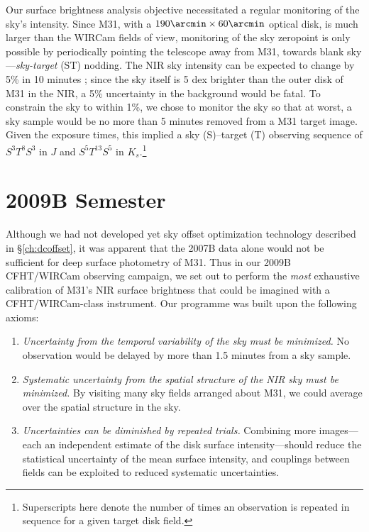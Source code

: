 \documentclass[iop]{emulateapj}
\begin{document}
Our surface brightness analysis objective necessitated a regular monitoring of the sky's intensity. Since M31, with a $190\arcmin \times 60\arcmin$ optical disk, is much larger than the WIRCam fields of view, monitoring of the sky zeropoint is only possible by periodically pointing the telescope away from M31, towards blank sky---\emph{sky-target} (ST) nodding. The NIR sky intensity can be expected to change by 5\% in 10 minutes \citep{Adams:1996,Vaduvescu:2004}; since the sky itself is 5 dex brighter than the outer disk of M31 in the NIR, a 5\% uncertainty in the background would be fatal. To constrain the sky to within 1\%, we chose to monitor the sky so that at worst, a sky sample would be no more than 5 minutes removed from a M31 target image. Given the exposure times, this implied a sky (S)--target (T) observing sequence of $S^3T^8S^3$ in $J$ and $S^5T^{13}S^5$ in $K_s$.\footnote{Superscripts here denote the number of times an observation is repeated in sequence for a given target disk field.}

\section{2009B Semester}
\label{sec:obs9}

Although we had not developed yet sky offset optimization technology described in \S \ref{ch:dcoffset}, it was apparent that the 2007B data alone would not be sufficient for deep surface photometry of M31. Thus in our 2009B CFHT/WIRCam observing campaign, we set out to perform the \emph{most} exhaustive calibration of M31's NIR surface brightness that could be imagined with a CFHT/WIRCam-class instrument. Our programme was built upon the following axioms:

\begin{enumerate}
    \item \emph{Uncertainty from the temporal variability of the sky must be minimized.} No observation would be delayed by more than 1.5 minutes from a sky sample.
    \item \emph{Systematic uncertainty from the spatial structure of the NIR sky must be minimized.} By visiting many sky fields arranged about M31, we could average over the spatial structure in the sky.
    \item \emph{Uncertainties can be diminished by repeated trials.} Combining more images---each an independent estimate of the disk surface intensity---should reduce the statistical uncertainty of the mean surface intensity, and couplings between fields can be exploited to reduced systematic uncertainties.
\end{enumerate}
\end{document}
